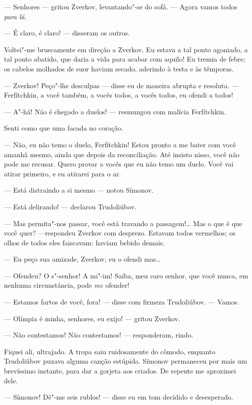 --- Senhores --- gritou Zverkov, levantando"-se do sofá. --- Agora vamos todos
\textit{para lá}.

--- É claro, é claro! --- disseram os outros.

Voltei"-me bruscamente em direção a Zverkov. Eu estava a tal ponto
agoniado, a tal ponto abatido, que daria a vida para acabar com aquilo!
Eu tremia de febre; os cabelos molhados de suor haviam secado, aderindo
à testa e às têmporas.

--- Zverkov! Peço"-lhe desculpas --- disse eu de maneira abrupta e resoluta.
--- Ferfítchkin, a você também, a vocês todos, a vocês todos, eu ofendi a
todos!

--- A"-há! Não é chegado a duelos! --- resmungou com malícia Ferfítchkin.

Senti como que uma facada no coração.

--- Não, eu não temo o duelo, Ferfítchkin! Estou pronto a me bater com
você amanhã mesmo, ainda que depois da reconciliação. Até insisto
nisso, você não pode me recusar. Quero provar a vocês que eu não temo
um duelo. Você vai atirar primeiro, e eu atirarei para o ar.

--- Está distraindo a si mesmo --- notou Símonov.

--- Está delirando! --- declarou Trudoliúbov.

--- Mas permita"-nos passar, você está travando a passagem!\ldots{} Mas o que é
que você quer? ---respondeu Zverkov com desprezo. Estavam todos
vermelhos; os olhos de todos eles faiscavam: haviam bebido demais.

--- Eu peço sua amizade, Zverkov, eu o ofendi mas\ldots{}

--- Ofendeu? O s"-senhor! A mi"-im! Saiba, meu caro senhor, que você nunca,
em nenhuma circunstância, pode \textit{me} ofender!

--- Estamos fartos de você, fora! --- disse com firmeza Trudoliúbov. ---
Vamos.

--- Olímpia é minha, senhores, eu exijo! --- gritou Zverkov.

--- Não contestamos! Não contestamos! --- responderam, rindo.

Fiquei ali, ultrajado. A tropa saiu ruidosamente do cômodo, enquanto
Trudoliúbov puxava alguma canção estúpida. Símonov permaneceu por mais
um brevíssimo instante, para dar a gorjeta aos criados. De repente me
aproximei dele.

--- Símonov! Dê"-me seis rublos! --- disse eu em tom decidido e desesperado.

